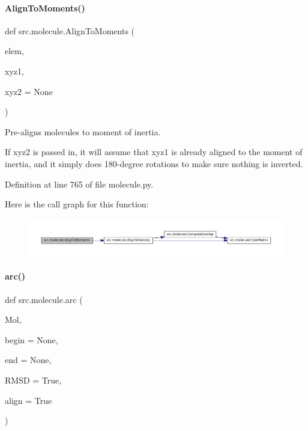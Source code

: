 \paragraph{\texorpdfstring{Align\+To\+Moments()}{AlignToMoments()}}
{\footnotesize\ttfamily def src.\+molecule.\+Align\+To\+Moments (\begin{DoxyParamCaption}\item[{}]{elem,  }\item[{}]{xyz1,  }\item[{}]{xyz2 = {\ttfamily None} }\end{DoxyParamCaption})}



Pre-\/aligns molecules to \textquotesingle{}moment of inertia\textquotesingle{}. 

If xyz2 is passed in, it will assume that xyz1 is already aligned to the moment of inertia, and it simply does 180-\/degree rotations to make sure nothing is inverted. 

Definition at line 765 of file molecule.\+py.

Here is the call graph for this function\+:
\nopagebreak
\begin{figure}[H]
\begin{center}
\leavevmode
\includegraphics[width=350pt]{namespacesrc_1_1molecule_a06bd27c59ccdbde31fbefbdec2daf1ad_cgraph}
\end{center}
\end{figure}
\mbox{\label{namespacesrc_1_1molecule_a28c672c2de7b942b427a22f3b433b04e}} 
\paragraph{\texorpdfstring{arc()}{arc()}}
{\footnotesize\ttfamily def src.\+molecule.\+arc (\begin{DoxyParamCaption}\item[{}]{Mol,  }\item[{}]{begin = {\ttfamily None},  }\item[{}]{end = {\ttfamily None},  }\item[{}]{R\+M\+SD = {\ttfamily True},  }\item[{}]{align = {\ttfamily True} }\end{DoxyParamCaption})}



